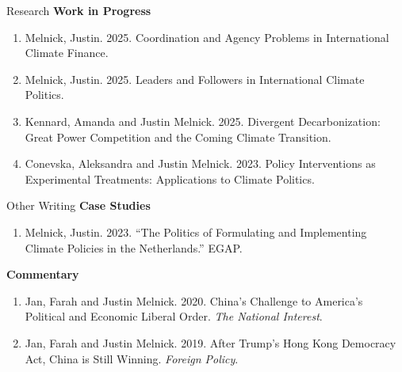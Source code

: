 \documentclass{resume} %
\begin{document}
\begin{rSection}{Research}
\textbf{Work in Progress}
\begin{enumerate}
\item Melnick, Justin. 2025. Coordination and Agency Problems in International Climate Finance.
\item Melnick, Justin. 2025. Leaders and Followers in International Climate Politics.
\item Kennard, Amanda and Justin Melnick. 2025. Divergent Decarbonization: Great Power Competition and the Coming Climate Transition.
    \item Conevska, Aleksandra and Justin Melnick. 2023. Policy Interventions as Experimental Treatments: Applications to Climate Politics.
\end{enumerate}

\end{rSection}

\newpage

\begin{rSection}{Other Writing}
\textbf{Case Studies}
\begin{enumerate}
\item Melnick, Justin. 2023. ``The Politics of Formulating and Implementing Climate Policies in the Netherlands.'' EGAP.
\end{enumerate}

\textbf{Commentary}
    \begin{enumerate}
    \item   Jan, Farah and Justin Melnick. 2020. China's Challenge to America's Political and Economic Liberal Order. \textit{The National Interest}.
    \item    Jan, Farah and Justin Melnick. 2019. After Trump's Hong Kong Democracy Act, China is Still Winning. \textit{Foreign Policy}.
\end{enumerate}
\end{rSection}
\end{document}
